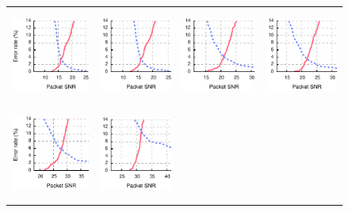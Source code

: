 \begin{figure}[p]
\begin{leftfullpage}
\begin{tabular}{cccc}
	\midrule
	\includegraphics[height=1.2in]{figures/delivery_figures/goodbad/packet_snr_goodbad_16.pdf} &
	\includegraphics[height=1.2in]{figures/delivery_figures/goodbad/packet_snr_goodbad_17.pdf} &
	\includegraphics[height=1.2in]{figures/delivery_figures/goodbad/packet_snr_goodbad_18.pdf} &
	\includegraphics[height=1.2in]{figures/delivery_figures/goodbad/packet_snr_goodbad_19.pdf} \\
	\includegraphics[height=1.2in]{figures/delivery_figures/goodbad/packet_snr_goodbad_20.pdf} &
	\includegraphics[height=1.2in]{figures/delivery_figures/goodbad/packet_snr_goodbad_21.pdf} &

\end{tabular}
\end{leftfullpage}
\end{figure}
